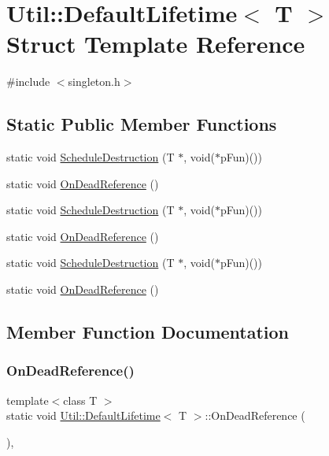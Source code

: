 \hypertarget{structUtil_1_1DefaultLifetime}{}\section{Util\+:\+:Default\+Lifetime$<$ T $>$ Struct Template Reference}
\label{structUtil_1_1DefaultLifetime}


{\ttfamily \#include $<$singleton.\+h$>$}

\subsection*{Static Public Member Functions}
\begin{DoxyCompactItemize}
\item 
static void \mbox{\hyperlink{structUtil_1_1DefaultLifetime_a2a646e6fc88719ca87092383c223850b}{Schedule\+Destruction}} (T $\ast$, void($\ast$p\+Fun)())
\item 
static void \mbox{\hyperlink{structUtil_1_1DefaultLifetime_a166e155ff3682f6482e3cd6e502d2d83}{On\+Dead\+Reference}} ()
\item 
static void \mbox{\hyperlink{structUtil_1_1DefaultLifetime_a2a646e6fc88719ca87092383c223850b}{Schedule\+Destruction}} (T $\ast$, void($\ast$p\+Fun)())
\item 
static void \mbox{\hyperlink{structUtil_1_1DefaultLifetime_a166e155ff3682f6482e3cd6e502d2d83}{On\+Dead\+Reference}} ()
\item 
static void \mbox{\hyperlink{structUtil_1_1DefaultLifetime_a2a646e6fc88719ca87092383c223850b}{Schedule\+Destruction}} (T $\ast$, void($\ast$p\+Fun)())
\item 
static void \mbox{\hyperlink{structUtil_1_1DefaultLifetime_a166e155ff3682f6482e3cd6e502d2d83}{On\+Dead\+Reference}} ()
\end{DoxyCompactItemize}


\subsection{Member Function Documentation}
\mbox{\label{structUtil_1_1DefaultLifetime_a166e155ff3682f6482e3cd6e502d2d83}} 
\subsubsection{\texorpdfstring{OnDeadReference()}{OnDeadReference()}\hspace{0.1cm}{\footnotesize\ttfamily [1/3]}}
{\footnotesize\ttfamily template$<$class T $>$ \\
static void \mbox{\hyperlink{structUtil_1_1DefaultLifetime}{Util\+::\+Default\+Lifetime}}$<$ T $>$\+::On\+Dead\+Reference (\begin{DoxyParamCaption}{ }\end{DoxyParamCaption})\hspace{0.3cm}{\ttfamily [inline]}, {\ttfamily [static]}}

